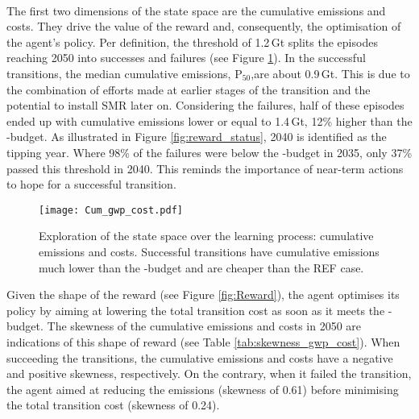 \\

The first two dimensions of the state space are the cumulative emissions and costs. They drive the value of the reward and, consequently, the optimisation of the agent's policy. Per definition, the threshold of 1.2\,Gt splits the episodes reaching 2050 into successes and failures (see Figure \ref{fig:Cum_gwp_cost}). In the successful transitions, the median cumulative emissions, $\text{P}_{50}$,are about 0.9\,Gt. This is due to the combination of efforts made at earlier stages of the transition and the potential to install \gls{SMR} later on. Considering the failures, half of these episodes ended up with cumulative emissions lower or equal to 1.4\,Gt, 12\% higher than the -budget. As illustrated in Figure \ref{fig:reward_status}, 2040 is identified as the tipping year. Where 98\% of the failures were below the -budget in 2035, only 37\% passed this threshold in 2040. This reminds the importance of near-term actions to hope for a successful transition.

\begin{figure}[!htbp]
\centering
\texttt{[image: Cum\_gwp\_cost.pdf]}
\caption{Exploration of the state space over the learning process: cumulative emissions and costs. Successful transitions have cumulative emissions much lower than the -budget and are cheaper than the REF case. }
\label{fig:Cum_gwp_cost}
\end{figure}

Given the shape of the reward (see Figure \ref{fig:Reward}), the agent optimises its policy by aiming at lowering the total transition cost as soon as it meets the -budget. The skewness of the cumulative emissions and costs in 2050 are indications of this shape of reward (see Table \ref{tab:skewness_gwp_cost}). When succeeding the transitions, the cumulative emissions and costs have a negative and positive skewness, respectively. On the contrary, when it failed the transition, the agent aimed at reducing the emissions (skewness of 0.61) before minimising the total transition cost (skewness of 0.24). 

